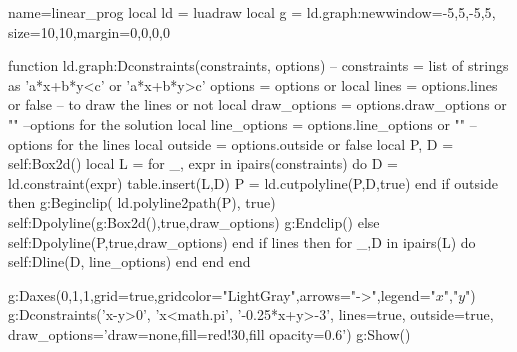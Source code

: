 \documentclass[]{standalone}
\begin{document}
\begin{luadraw}{name=linear_prog}
local ld = luadraw
local g = ld.graph:new{window={-5,5,-5,5}, size={10,10},margin={0,0,0,0}}

function ld.graph:Dconstraints(constraints, options)
-- constraints = list of strings as 'a*x+b*y<c' or 'a*x+b*y>c'
    options = options or {}
    local lines = options.lines or false -- to draw the lines or not
    local draw_options = options.draw_options or ""  --options for the solution
    local line_options = options.line_options or "" -- options for the lines
    local outside = options.outside or false
    local P, D = self:Box2d()
    local L = {}
    for _, expr in ipairs(constraints) do
        D = ld.constraint(expr)
        table.insert(L,D)
        P = ld.cutpolyline(P,D,true)
    end
    if outside then
        g:Beginclip( ld.polyline2path(P), true)
            self:Dpolyline(g:Box2d(),true,draw_options)
        g:Endclip()
    else
        self:Dpolyline(P,true,draw_options)
    end
    if lines then 
        for _,D in ipairs(L) do self:Dline(D, line_options) end
    end
end

g:Daxes({0,1,1},{grid=true,gridcolor="LightGray",arrows="->",legend={"$x$","$y$"}})
g:Dconstraints({'x-y>0', 'x<math.pi', '-0.25*x+y>-3'}, 
    {lines=true, outside=true, draw_options='draw=none,fill=red!30,fill opacity=0.6'})
g:Show()
\end{luadraw}
\end{document}
